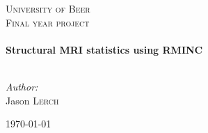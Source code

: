 \begin{titlepage}
 
\begin{center}
 
 
 
\textsc{\LARGE University of Beer}\\[1.5cm]
 
\textsc{\Large Final year project}\\[0.5cm]
 
 
\HRule \\[0.4cm]
{ \huge \bfseries Structural MRI statistics using RMINC}\\[0.4cm]
 
\HRule \\[1.5cm]
 
\begin{minipage}{0.4\textwidth}
\begin{flushleft} \large
\emph{Author:}\\
Jason \textsc{Lerch}
\end{flushleft}
\end{minipage}
 
\vfill
 
{\large \today}
 
\end{center}
 
\end{titlepage}
